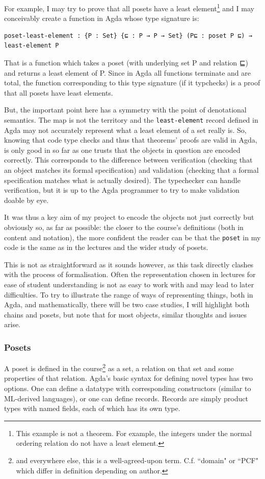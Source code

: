 \documentclass[12pt,a4paper,twoside,openright]{report}
\begin{document}
For example, I may try to prove that all posets have a least element\footnote{This example is not a theorem. For example, the integers under the normal ordering relation do not have a least element.} and I may conceivably create a function in Agda whose type signature is:
\begin{verbatim}
poset-least-element : {P : Set} {⊑ : P → P → Set} (P⊑ : poset P ⊑) → least-element P
\end{verbatim}
That is a function which takes a poset (with underlying set P and relation ⊑) and returns a least element of P. Since in Agda all functions terminate and are total, the function corresponding to this type signature (if it typchecks) is a proof that all posets have least elements.

But, the important point here has a symmetry with the point of denotational semantics. The map is not the territory and the \texttt{least-element} record defined in Agda may not accurately represent what a least element of a set really is. So, knowing that code type checks and thus that theorems' proofs are valid in Agda, is only good in so far as one trusts that the objects in question are encoded correctly. This corresponds to the difference between verification (checking that an object matches its formal specification) and validation (checking that a formal specification matches what is actually desired). The typechecker can handle verification, but it is up to the Agda programmer to try to make validation doable by eye. 

It was thus a key aim of my project to encode the objects not just correctly but obviously so, as far as possible: the closer to the course's definitions (both in content and notation), the more confident the reader can be that the \texttt{poset} in my code is the same as in the lectures and the wider study of posets. 

This is not as straightforward as it sounds however, as this task directly clashes with the process of formalisation. Often the representation chosen in lectures for ease of student understanding is not as easy to work with and may lead to later difficulties. To try to illustrate the range of ways of representing things, both in Agda, and mathematically, there will be two case studies, I will highlight both chains and posets, but note that for most objects, similar thoughts and issues arise. 
\subsubsection{Posets}
A poset is defined in the course\footnote{and everywhere else, this is a well-agreed-upon term. C.f. ``domain" or ``PCF" which differ in definition depending on author.} as a set, a relation on that set and some properties of that relation. Agda's basic syntax for defining novel types has two options. One can define a datatype with corresponding constructors (similar to ML-derived languages), or one can define records. Records are simply product types with named fields, each of which has its own type. 
\end{document}
